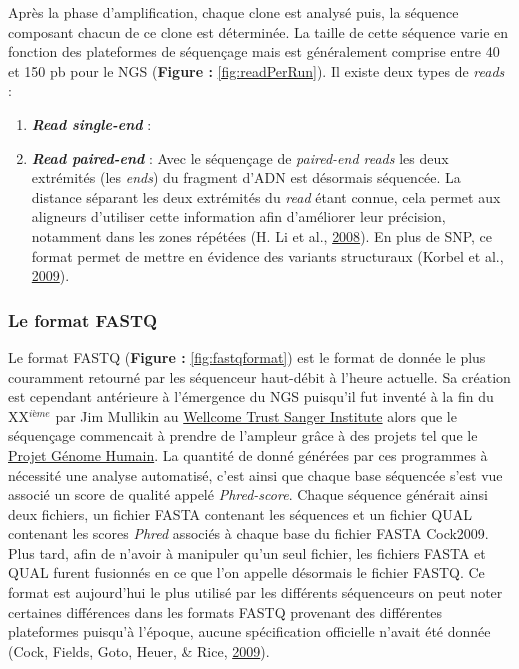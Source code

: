 \documentclass[12pt,twoside]{reedthesis}
\providecommand{\tightlist}{%
  \setlength{\itemsep}{0pt}\setlength{\parskip}{0pt}}
\theoremstyle{definition}
\theoremstyle{definition}
\theoremstyle{remark}
\begin{document}
  Après la phase d'amplification, chaque clone est analysé puis, la
  séquence composant chacun de ce clone est déterminée. La taille de cette
  séquence varie en fonction des plateformes de séquençage mais est
  généralement comprise entre 40 et 150 pb pour le NGS (\textbf{Figure :
  }\ref{fig:readPerRun}). Il existe deux types de \emph{reads} :
  
  \begin{enumerate}
  \def\labelenumi{\arabic{enumi}.}
  \tightlist
  \item
    \textbf{\emph{Read single-end} }:\\
  \item
    \textbf{\emph{Read paired-end} }: Avec le séquençage de
    \emph{paired-end reads} les deux extrémités (les \emph{ends}) du
    fragment d'ADN est désormais séquencée. La distance séparant les deux
    extrémités du \emph{read} étant connue, cela permet aux aligneurs
    d'utiliser cette information afin d'améliorer leur précision,
    notamment dans les zones répétées (H. Li et al.,
    \protect\hyperlink{ref-Li2008}{2008}). En plus de SNP, ce format
    permet de mettre en évidence des variants structuraux (Korbel et al.,
    \protect\hyperlink{ref-Korbel2009}{2009}).
  \end{enumerate}
  
  \subsubsection{Le format FASTQ}\label{le-format-fastq}
  
  Le format FASTQ (\textbf{Figure : }\ref{fig:fastqformat}) est le format
  de donnée le plus couramment retourné par les séquenceur haut-débit à
  l'heure actuelle. Sa création est cependant antérieure à l'émergence du
  NGS puisqu'il fut inventé à la fin du XX\(^{ième}\) par Jim Mullikin au
  \href{https://fr.wikipedia.org/wiki/Wellcome_Trust_Sanger_Institute}{Wellcome
  Trust Sanger Institute} alors que le séquençage commencait à prendre de
  l'ampleur grâce à des projets tel que le
  \href{https://fr.wikipedia.org/wiki/Projet_G\%C3\%A9nome_Humain}{Projet
  Génome Humain}. La quantité de donné générées par ces programmes à
  nécessité une analyse automatisé, c'est ainsi que chaque base séquencée
  s'est vue associé un score de qualité appelé \emph{Phred-score}. Chaque
  séquence générait ainsi deux fichiers, un fichier FASTA contenant les
  séquences et un fichier QUAL contenant les scores \emph{Phred} associés
  à chaque base du fichier FASTA Cock2009. Plus tard, afin de n'avoir à
  manipuler qu'un seul fichier, les fichiers FASTA et QUAL furent
  fusionnés en ce que l'on appelle désormais le fichier FASTQ. Ce format
  est aujourd'hui le plus utilisé par les différents séquenceurs on peut
  noter certaines différences dans les formats FASTQ provenant des
  différentes plateformes puisqu'à l'époque, aucune spécification
  officielle n'avait été donnée (Cock, Fields, Goto, Heuer, \& Rice,
  \protect\hyperlink{ref-Cock2009}{2009}).
  
\end{document}
